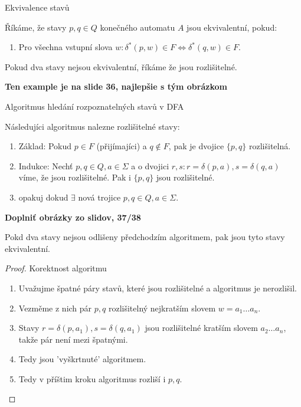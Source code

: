 \documentclass[../main.tex]{subfiles}
\begin{document}
\begin{definition}
    Ekvivalence stavů

    Říkáme, že stavy $p,q \in Q$ konečného automatu $A$ jsou ekvivalentní, pokud:
    \begin{enumerate}
        \item Pro všechna vstupní slova $w: \delta^*(p,w) \in F \Leftrightarrow \delta^*(q,w)\in F$.
    \end{enumerate}
    Pokud dva stavy nejsou ekvivalentní, říkáme že jsou rozlišitelné.
\end{definition}
\begin{example}
        \textbf{Ten example je na slide 36, najlepšie s tým obrázkom}
\end{example}

\begin{definition}
    Algoritmus hledání rozpoznatelných stavů v DFA

    Následujíci algoritmus nalezne rozlišitelné stavy:
    \begin{enumerate}
        \item Základ: Pokud $p\in F$ (přijímajíci) a $q \notin F$, pak je dvojice $\{p,q\}$ rozlišitelná.
        \item Indukce: Nechť $p,q\in Q, a \in \Sigma$ a o dvojici $r,s : r = \delta(p,a), s= \delta(q,a)$ víme,
        že jsou rozlišitelné. Pak i $\{p,q\}$ jsou rozlišitelné.
        \item opakuj dokud $\exists$ nová trojice $p,q\in Q, a\in \Sigma$.
    \end{enumerate}
    \textbf{Doplniť obrázky zo slidov, 37/38}
\end{definition}

\begin{theorem}
    Pokd dva stavy nejsou odlišeny předchodzím algoritmem, pak jsou tyto stavy ekvivalentní.
    \begin{proof}
        Korektnost algoritmu
        \begin{enumerate}
            \item Uvažujme špatné páry stavů, které jsou rozlišitelné a algoritmus je nerozlišil.
            \item Vezměme z nich pár $p,q$ rozlišitelný nejkratším slovem $w = a_1\dots a_n.$
            \item Stavy $r = \delta(p,a_1), s= \delta(q,a_1)$ jsou rozlišitelné kratším slovem 
            $a_2\dots a_n$, takže pár není mezi špatnými.
            \item Tedy jsou 'vyškrtnuté' algoritmem.
            \item Tedy v příštim kroku algoritmus rozliší i $p,q$.
        \end{enumerate}
    \end{proof}
\end{theorem}
\end{document}
